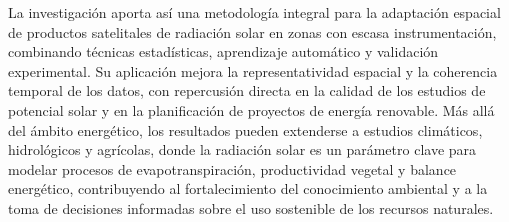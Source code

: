 La investigación aporta así una metodología integral para la adaptación espacial de productos
satelitales de radiación solar en zonas con escasa instrumentación, combinando técnicas
estadísticas, aprendizaje automático y validación experimental. Su aplicación mejora la
representatividad espacial y la coherencia temporal de los datos, con repercusión directa en
la calidad de los estudios de potencial solar y en la planificación de proyectos de energía
renovable. Más allá del ámbito energético, los resultados pueden extenderse a estudios
climáticos, hidrológicos y agrícolas, donde la radiación solar es un parámetro clave para
modelar procesos de evapotranspiración, productividad vegetal y balance energético,
contribuyendo al fortalecimiento del conocimiento ambiental y a la toma de decisiones
informadas sobre el uso sostenible de los recursos naturales.

